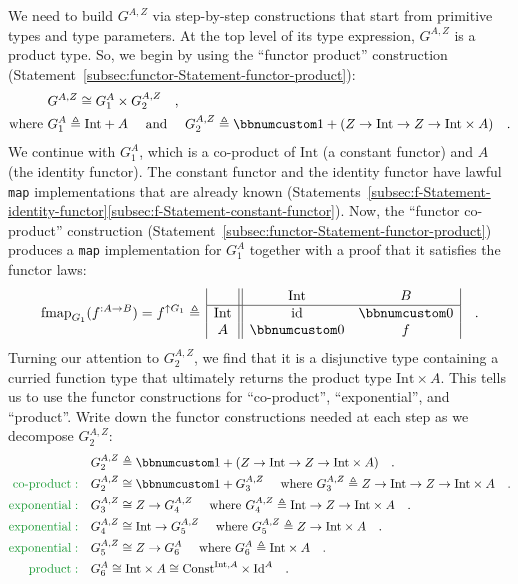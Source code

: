 We need to build $G^{A,Z}$ via step-by-step constructions that start
from primitive types and type parameters. At the top level of its
type expression, $G^{A,Z}$ is a product type. So, we begin by using
the \textsf{``}functor product\textsf{''} construction (Statement~\ref{subsec:functor-Statement-functor-product}):
\begin{align*}
 & G^{A,Z}\cong G_{1}^{A}\times G_{2}^{A,Z}\quad,\\
\text{where } & G_{1}^{A}\triangleq\text{Int}+A\quad\text{ and }\quad G_{2}^{A,Z}\triangleq\bbnum 1+(Z\rightarrow\text{Int}\rightarrow Z\rightarrow\text{Int}\times A)\quad.
\end{align*}
We continue with $G_{1}^{A}$, which is a co-product of $\text{Int}$
(a constant functor) and $A$ (the identity functor). The constant
functor and the identity functor have lawful \lstinline!map! implementations
that are already known (Statements~\ref{subsec:f-Statement-identity-functor}\textendash \ref{subsec:f-Statement-constant-functor}).
Now, the \textsf{``}functor co-product\textsf{''} construction (Statement~\ref{subsec:functor-Statement-functor-product})
produces a \lstinline!map! implementation for $G_{1}^{A}$ together
with a proof that it satisfies the functor laws:
\[
\text{fmap}_{G_{1}}(f^{:A\rightarrow B})=f^{\uparrow G_{1}}\triangleq\,\begin{array}{|c||cc|}
 & \text{Int} & B\\
\hline \text{Int} & \text{id} & \bbnum 0\\
A & \bbnum 0 & f
\end{array}\quad.
\]
Turning our attention to $G_{2}^{A,Z}$, we find that it is a disjunctive
type containing a curried function type that ultimately returns the
product type $\text{Int}\times A$. This tells us to use the functor
constructions for \textsf{``}co-product\textsf{''}, \textsf{``}exponential\textsf{''}, and \textsf{``}product\textsf{''}.
Write down the functor constructions needed at each step as we decompose
$G_{2}^{A,Z}$:
\begin{align*}
 & G_{2}^{A,Z}\triangleq\bbnum 1+(Z\rightarrow\text{Int}\rightarrow Z\rightarrow\text{Int}\times A)\quad.\\
{\color{greenunder}\text{co-product}:}\quad & G_{2}^{A,Z}\cong\bbnum 1+G_{3}^{A,Z}\quad\text{ where }G_{3}^{A,Z}\triangleq Z\rightarrow\text{Int}\rightarrow Z\rightarrow\text{Int}\times A\quad.\\
{\color{greenunder}\text{exponential}:}\quad & G_{3}^{A,Z}\cong Z\rightarrow G_{4}^{A,Z}\quad\text{ where }G_{4}^{A,Z}\triangleq\text{Int}\rightarrow Z\rightarrow\text{Int}\times A\quad.\\
{\color{greenunder}\text{exponential}:}\quad & G_{4}^{A,Z}\cong\text{Int}\rightarrow G_{5}^{A,Z}\quad\text{ where }G_{5}^{A,Z}\triangleq Z\rightarrow\text{Int}\times A\quad.\\
{\color{greenunder}\text{exponential}:}\quad & G_{5}^{A,Z}\cong Z\rightarrow G_{6}^{A}\quad\text{ where }G_{6}^{A}\triangleq\text{Int}\times A\quad.\\
{\color{greenunder}\text{product}:}\quad & G_{6}^{A}\cong\text{Int}\times A\cong\text{Const}^{\text{Int},A}\times\text{Id}^{A}\quad.
\end{align*}
